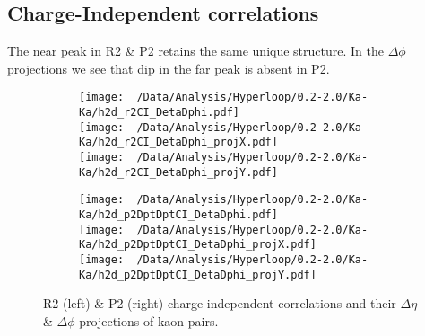 \documentclass[12pt,a4paper,twoside]{report}
\begin{document}
\subsection{Charge-Independent correlations}
The near peak in R2 \& P2 retains the same unique structure. In the $\Delta\phi$ projections we see that dip in the far peak is absent in P2.
\begin{figure}[H]
	\begin{subfigure}{0.49\linewidth}
		\texttt{[image: ~/Data/Analysis/Hyperloop/0.2-2.0/Ka-Ka/h2d\_r2CI\_DetaDphi.pdf]}\\
		\texttt{[image: ~/Data/Analysis/Hyperloop/0.2-2.0/Ka-Ka/h2d\_r2CI\_DetaDphi\_projX.pdf]}\\
		\texttt{[image: ~/Data/Analysis/Hyperloop/0.2-2.0/Ka-Ka/h2d\_r2CI\_DetaDphi\_projY.pdf]}\\
	\end{subfigure}
	\begin{subfigure}{0.49\linewidth}
		\texttt{[image: ~/Data/Analysis/Hyperloop/0.2-2.0/Ka-Ka/h2d\_p2DptDptCI\_DetaDphi.pdf]}\\
		\texttt{[image: ~/Data/Analysis/Hyperloop/0.2-2.0/Ka-Ka/h2d\_p2DptDptCI\_DetaDphi\_projX.pdf]}\\
		\texttt{[image: ~/Data/Analysis/Hyperloop/0.2-2.0/Ka-Ka/h2d\_p2DptDptCI\_DetaDphi\_projY.pdf]}\\
	\end{subfigure}
	\caption{R2 (left) \& P2 (right) charge-independent correlations and their $\Delta\eta$ \& $\Delta\phi$ projections of kaon pairs.}
\end{figure}
\end{document}
